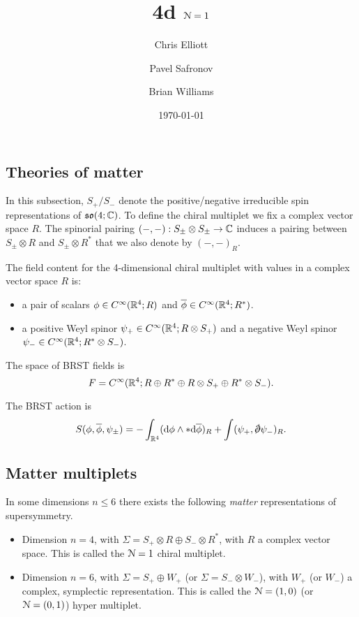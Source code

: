 \documentclass[10pt, oneside]{article}
\title{4d $\mathcal N=1$}
\author{Chris Elliott\and Pavel Safronov \and Brian Williams}
\date{\today}
\begin{document}
\maketitle

\subsection{Theories of matter}
In this subsection, $S_+ / S_-$ denote the positive/negative irreducible spin representations of $\mathfrak{so}(4; \mathbb C)$. 
To define the chiral multiplet we fix a complex vector space $R$.
The spinorial pairing $(-,-) : S_\pm \otimes S_\pm \to \mathbb C$ induces a pairing between $S_\pm \otimes R$ and $S_{\pm} \otimes R^*$ that we also denote by $(-,-)_R$. 

The field content for the 4-dimensional chiral multiplet with values in a complex vector space $R$ is:
\begin{itemize}
\item a pair of scalars $\phi \in C^\infty(\mathbb R^4 ; R)$ and $\overline{\phi} \in C^\infty(\mathbb R^4 ; R^*)$.
\item a positive Weyl spinor $\psi_+ \in C^\infty(\mathbb R^4 ; R \otimes S_+)$ and a negative Weyl spinor $\psi_- \in C^\infty(\mathbb R^4 ; R^* \otimes S_-)$.
\end{itemize}

The space of BRST fields is 
\[
F = C^\infty(\mathbb R^4 ; R \oplus R^* \oplus R \otimes S_+ \oplus R^* \otimes S_-) .
\]

The BRST action is
\[
S (\phi, \Bar{\phi}, \psi_\pm) = - \int_{\RR^4} (\d \phi \wedge * \d \Bar{\phi})_R + \int (\psi_+ , \sd \dd \psi_-)_R .
\]

\subsection{Matter multiplets}

In some dimensions $n \leq 6$ there exists the following {\em matter} representations of supersymmetry. 

\begin{itemize}
\item Dimension $n=4$, with $\Sigma = S_+ \otimes R \oplus S_- \otimes R^*$, with $R$ a complex vector space.
This is called the $\mathcal N=1$ chiral multiplet.
\item Dimension $n=6$, with $\Sigma = S_+ \oplus W_+$ (or $\Sigma = S_- \otimes W_-$), with $W_+$ (or $W_-$) a complex, symplectic representation. This is called the $\mathcal N=(1,0)$ (or $\mathcal N=(0,1)$) hyper multiplet. 
\end{itemize}
\end{document}
